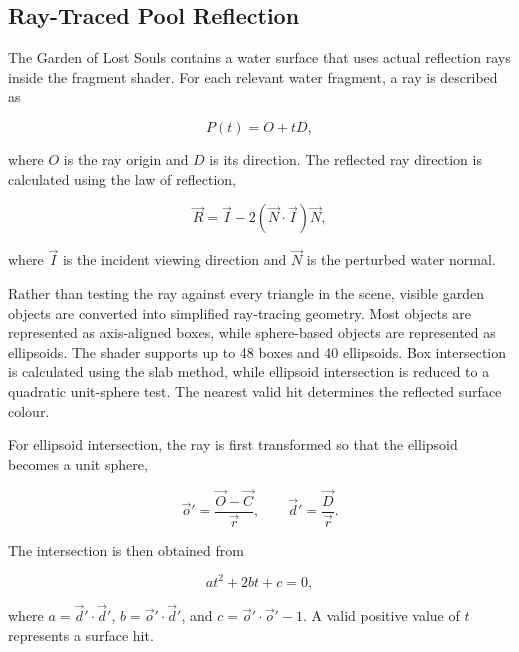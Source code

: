 \documentclass[11pt,a4paper]{article}
\begin{document}

\subsection{Ray-Traced Pool Reflection}

The Garden of Lost Souls contains a water surface that uses actual reflection
rays inside the fragment shader. For each relevant water fragment, a ray is
described as

\begin{equation}
    P(t)=O+tD ,
\end{equation}

where $O$ is the ray origin and $D$ is its direction. The reflected ray
direction is calculated using the law of reflection,

\begin{equation}
    \vec{R}
    =
    \vec{I}
    -
    2(\vec{N}\cdot\vec{I})\vec{N},
\end{equation}

where $\vec{I}$ is the incident viewing direction and $\vec{N}$ is the
perturbed water normal.

Rather than testing the ray against every triangle in the scene, visible garden
objects are converted into simplified ray-tracing geometry. Most objects are
represented as axis-aligned boxes, while sphere-based objects are represented
as ellipsoids. The shader supports up to 48 boxes and 40 ellipsoids. Box
intersection is calculated using the slab method, while ellipsoid intersection
is reduced to a quadratic unit-sphere test. The nearest valid hit determines
the reflected surface colour.

For ellipsoid intersection, the ray is first transformed so that the ellipsoid
becomes a unit sphere,

\begin{equation}
    \vec{o}'=\frac{\vec{O}-\vec{C}}{\vec{r}},
    \qquad
    \vec{d}'=\frac{\vec{D}}{\vec{r}} .
\end{equation}

The intersection is then obtained from

\begin{equation}
    at^2+2bt+c=0,
\end{equation}

where
$a=\vec{d}'\cdot\vec{d}'$,
$b=\vec{o}'\cdot\vec{d}'$, and
$c=\vec{o}'\cdot\vec{o}'-1$.
A valid positive value of $t$ represents a surface hit.
\end{document}
